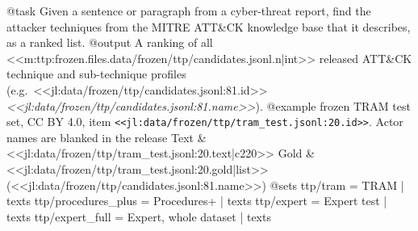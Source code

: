 @task
Given a sentence or paragraph from a cyber-threat report, find the attacker techniques from the MITRE ATT\&CK
knowledge base that it describes, as a ranked list.
@output
A ranking of all <<m:ttp:frozen.files.data/frozen/ttp/candidates.jsonl.n|int>> released ATT\&CK technique and
sub-technique profiles (e.g.\ <<jl:data/frozen/ttp/candidates.jsonl:81.id>> \emph{<<jl:data/frozen/ttp/candidates.jsonl:81.name>>}).
@example frozen TRAM test set, CC BY 4.0, item \texttt{<<jl:data/frozen/ttp/tram_test.jsonl:20.id>>}. Actor names are blanked in the release
Text & <<jl:data/frozen/ttp/tram_test.jsonl:20.text|c220>>
Gold & <<jl:data/frozen/ttp/tram_test.jsonl:20.gold|list>> (<<jl:data/frozen/ttp/candidates.jsonl:81.name>>)
@sets
ttp/tram = TRAM | texts
ttp/procedures_plus = Procedures+ | texts
ttp/expert = Expert test | texts
ttp/expert_full = Expert, whole dataset | texts

